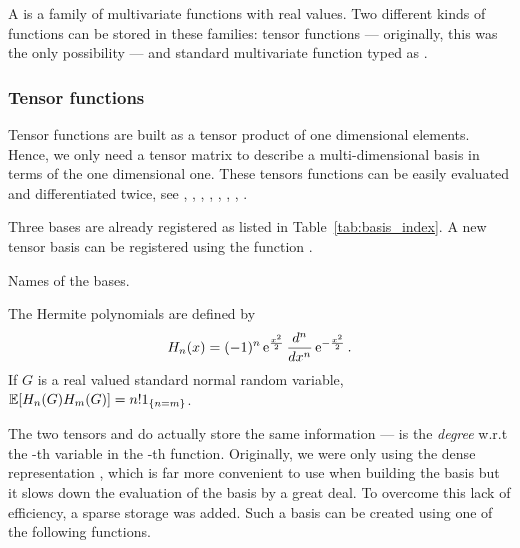 A  is a family of multivariate functions with real values. Two different kinds of functions can be stored in these families: tensor functions --- originally, this was the only possibility --- and standard multivariate function typed as .

\subsubsection{Tensor functions}

Tensor functions are built as a tensor product of one dimensional elements. Hence, we only need a tensor matrix  to describe a multi-dimensional basis in terms of the one dimensional one. These tensors functions can be easily evaluated and differentiated twice, see ,
, , ,
, ,
, .

Three bases are already registered as listed in Table~\ref{tab:basis_index}. A new tensor basis can be registered using the function
  .

\begin{table}[h!]
  \begin{describeconst}
  \end{describeconst}
  \caption{Names of the bases.}
  \label{tab:basis_index}
\end{table}

The Hermite polynomials are defined by
\begin{equation*}
  H_n(x) = (-1)^n \operatorname{e}^{ \frac{x^2}{2} } \frac{d^n}{dx^n} \operatorname{e}^{ -\frac{x^2}{2} }.
\end{equation*}
If $G$ is a real valued standard normal random variable, ${\mathbb E}[H_n(G) H_m(G)] = n!  1_{\left\{n = m\right\}}$.


The two tensors  and  do actually store the same information ---  is the \emph{degree} w.r.t the -th variable in the -th function. Originally, we were only using the dense representation , which is far more convenient to use when building the basis but it slows down the evaluation of the basis by a great deal. To overcome this lack of efficiency, a sparse storage was added. Such a basis can be created using one of the following functions.

